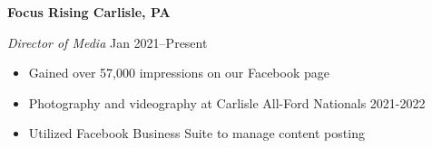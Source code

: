 \textbf{Focus Rising \hfill  Carlisle, PA} \par
\textit{Director of Media} \hfill Jan 2021--Present \par
\begin{itemize}
	\item Gained over 57,000 impressions on our Facebook page
	\item Photography and videography at Carlisle All-Ford Nationals 2021-2022
	\item Utilized Facebook Business Suite to manage content posting
\end{itemize} \par
